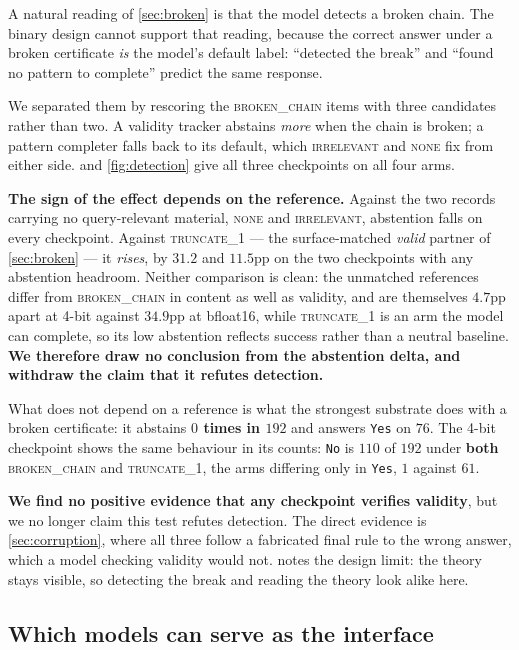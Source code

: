 \documentclass[10pt,twocolumn]{article}
\begin{document}
A natural reading of \cref{sec:broken} is that the model detects a broken chain.
The binary design cannot support that reading, because the correct answer under a
broken certificate \emph{is} the model's default label: ``detected the break'' and
``found no pattern to complete'' predict the same response.

We separated them by rescoring the \textsc{broken\_chain} items with three
candidates rather than two. A validity tracker abstains \emph{more} when the
chain is broken; a pattern completer falls back to its default, which
\textsc{irrelevant} and \textsc{none} fix from either side.
 and \cref{fig:detection} give all three checkpoints on all
four arms.

\textbf{The sign of the effect depends on the reference.} Against the two records
carrying no query-relevant material, \textsc{none} and \textsc{irrelevant},
abstention falls on every checkpoint. Against \textsc{truncate\_1} --- the
surface-matched \emph{valid} partner of \cref{sec:broken} --- it \emph{rises}, by
$31.2$ and $11.5$pp on the two checkpoints with any abstention headroom. Neither
comparison is clean: the unmatched references differ from \textsc{broken\_chain} in
content as well as validity, and are themselves $4.7$pp apart at 4-bit against
$34.9$pp at bfloat16, while \textsc{truncate\_1} is an arm the model can complete,
so its low abstention reflects success rather than a neutral baseline.
\textbf{We therefore draw no conclusion from the abstention delta, and withdraw
the claim that it refutes detection.}

What does not depend on a reference is what the strongest substrate does with a
broken certificate: it abstains \textbf{$0$ times in $192$} and answers
\texttt{Yes} on $76$. The 4-bit checkpoint shows the same behaviour in its counts:
\texttt{No} is $110$ of $192$ under \textbf{both} \textsc{broken\_chain} and
\textsc{truncate\_1}, the arms differing only in \texttt{Yes}, $1$ against $61$.

\textbf{We find no positive evidence that any checkpoint verifies validity}, but
we no longer claim this test refutes detection. The direct evidence is
\cref{sec:corruption}, where all three follow a fabricated final rule to the wrong
answer, which a model checking validity would not.  notes the design limit: the theory stays visible, so
detecting the break and reading the theory look alike here.

\subsection{Which models can serve as the interface}
\end{document}
